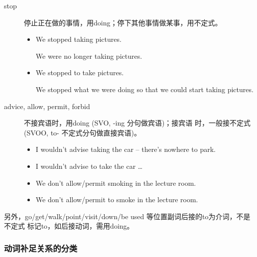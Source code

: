\begin{description}
\item[stop] 停止正在做的事情，用doing；停下其他事情做某事，用不定式。
  \begin{itemize}
  \item We stopped taking pictures.

    We were no longer taking pictures.

  \item We stopped to take pictures.

    We stopped what we were doing so that we could start taking pictures.
  \end{itemize}

\item[advice, allow, permit, forbid] 不接宾语时，用doing (SVO, -ing 分句做宾语)；接宾语
  时，一般接不定式 (SVOO, to- 不定式分句做直接宾语)。
  \begin{itemize}
  \item I wouldn't advise taking the car – there's nowhere to park.
  \item I wouldn't advise  to take the car …
  \item We don't allow/permit smoking in the lecture room.
  \item We don't allow/permit  to smoke in the lecture room.
  \end{itemize}
\end{description}

另外，go/get/walk/point/visit/down/be used 等位置副词后接的to为介词，不是不定式
标记to，如后接动词，需用doing。

\subsubsection{动词补足关系的分类}

